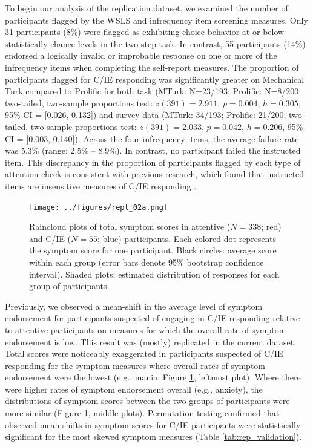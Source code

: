 \documentclass[a4paper,notitlepage,12pt]{article}
\begin{document}
To begin our analysis of the replication dataset, we examined the number of participants flagged by the WSLS and infrequency item screening measures. Only 31 participants (8\%) were flagged as exhibiting choice behavior at or below statistically chance levels in the two-step task. In contrast, 55 participants (14\%) endorsed a logically invalid or improbable response on one or more of the infrequency items when completing the self-report measures. The proportion of participants flagged for C/IE responding was significantly greater on Mechanical Turk compared to Prolific for both task (MTurk: N=23/193; Prolific: N=8/200; two-tailed, two-sample proportions test: $z(391)=2.911$, $p=0.004$, $h=0.305$, 95\% CI = [0.026, 0.132]) and survey data (MTurk: 34/193; Prolific: 21/200; two-tailed, two-sample proportions test: $z(391)= 2.033$, $p=0.042$, $h=0.206$, 95\% CI = [0.003, 0.140]). Across the four infrequency items, the average failure rate was 5.3\% (range: 2.5\% -- 8.9\%). In contrast, no participant failed the instructed item. This discrepancy in the proportion of participants flagged by each type of attention check is consistent with previous research, which found that instructed items are insensitive measures of C/IE responding \cite{barends2019noncompliant-2, thomas2017validity-2, hauser2016attentive-2}.   

\begin{figure}[t!]
    \texttt{[image: ../figures/repl\_02a.png]}
    \centering
    \captionsetup{width=0.88\textwidth}
    \caption{Raincloud plots of total symptom scores in attentive ($N=338$; red) and C/IE ($N=55$; blue) participants. Each colored dot represents the symptom score for one participant. Black circles: average score within each group (error bars denote 95\% bootstrap confidence interval). Shaded plots: estimated distribution of responses for each group of participants.}
    \label{fig:repl_distributions}
\end{figure}

Previously, we observed a mean-shift in the average level of symptom endorsement for participants suspected of engaging in C/IE responding relative to attentive participants on measures for which the overall rate of symptom endorsement is low. This result was (mostly) replicated in the current dataset. Total scores were noticeably exaggerated in participants suspected of C/IE responding for the symptom measures where overall rates of symptom endorsement were the lowest (e.g., mania; Figure \ref{fig:repl_distributions}, leftmost plot). Where there were higher rates of symptom endorsement overall (e.g., anxiety), the distributions of symptom scores between the two groups of participants were more similar (Figure \ref{fig:repl_distributions}, middle plots). Permutation testing confirmed that observed mean-shifts in symptom scores for C/IE participants were statistically significant for the most skewed symptom measures (Table \ref{tab:rep_validation}).
\end{document}
